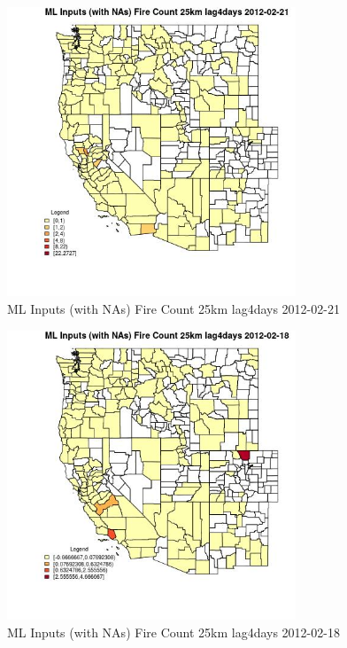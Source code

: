 \begin{figure} 
\centering  
\includegraphics[width=0.77\textwidth]{Code_Outputs/Report_ML_input_PM25_Step4_part_f_de_duplicated_aves_prioritize_24hr_obswNAs_CountyFire_Count_25km_lag4daysMean2012-02-21.jpg} 
\caption{\label{fig:Report_ML_input_PM25_Step4_part_f_de_duplicated_aves_prioritize_24hr_obswNAsCountyFire_Count_25km_lag4daysMean2012-02-21}ML Inputs (with NAs) Fire Count 25km lag4days 2012-02-21} 
\end{figure} 
 

\begin{figure} 
\centering  
\includegraphics[width=0.77\textwidth]{Code_Outputs/Report_ML_input_PM25_Step4_part_f_de_duplicated_aves_prioritize_24hr_obswNAs_CountyFire_Count_25km_lag4daysMean2012-02-18.jpg} 
\caption{\label{fig:Report_ML_input_PM25_Step4_part_f_de_duplicated_aves_prioritize_24hr_obswNAsCountyFire_Count_25km_lag4daysMean2012-02-18}ML Inputs (with NAs) Fire Count 25km lag4days 2012-02-18} 
\end{figure} 
 

